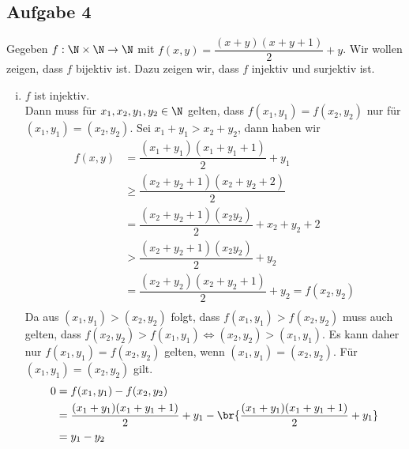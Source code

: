 \subsection*{Aufgabe 4}
%
Gegeben $f: \N \times \N \to \N$ mit $f(x,y) = \dfrac{ (x+y) (x+y+1) }{ 2 } + y$. Wir wollen zeigen, dass $f$ bijektiv ist. Dazu zeigen wir, dass $f$ injektiv und surjektiv ist. \\
%
\begin{enumerate}[i)]
%
\item $f$ ist injektiv.\\
%
Dann muss für $ x_1, x_2, y_1, y_2 \in \N $ gelten, dass $f(x_1, y_1) = f(x_2, y_2)$ nur für $(x_1, y_1) = (x_2, y_2)$.
%
Sei $x_1 + y_1 > x_2 + y_2$, dann haben wir
%
\begin{align*}
f(x,y) &= \dfrac{(x_1 + y_1) (x_1 + y_1 +1)}{2} + y_1 \\
       &\geq \dfrac{(x_2 + y_2 + 1) (x_2 + y_2 + 2)}{2} \\
       &= \dfrac{(x_2 + y_2 + 1)(x_2 y_2)}{2} + x_2 + y_2 + 2 \\
       &> \dfrac{(x_2 + y_2 + 1)(x_2 y_2)}{2} + y_2 \\
       &= \dfrac{(x_2 + y_2)(x_2 + y_2 + 1)}{2} + y_2 = f(x_2, y_2) \\
\end{align*}
%
Da aus $(x_1, y_1) > (x_2, y_2)$ folgt, dass $f(x_1, y_1) > f(x_2, y_2)$ muss auch gelten, dass $f(x_2, y_2) > f(x_1, y_1) \iff (x_2, y_2) > (x_1, y_1)$.
%
Es kann daher nur $f(x_1, y_1) = f(x_2, y_2)$ gelten, wenn $(x_1, y_1) = (x_2, y_2)$. Für $(x_1, y_1) = (x_2, y_2)$ gilt.
%
\begin{align*}
  0 &= f(x_1, y_1) - f(x_2, y_2) \\
  &= \dfrac{(x_1 + y_1)(x_1 + y_1 + 1)}{2} + y_1 - \br{\dfrac{(x_1 + y_1)(x_1 + y_1 + 1)}{2} + y_1}\\
  &= y_1 - y_2
\end{align*}


\end{enumerate}
